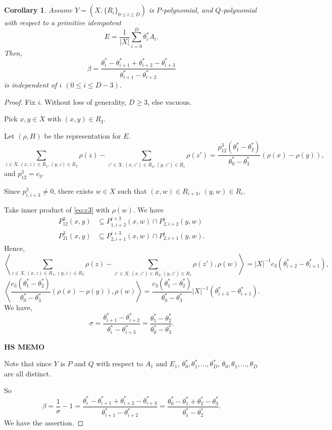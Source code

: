 \documentclass[
]{book}
\newtheorem{corollary}{Corollary}[chapter]
\theoremstyle{definition}
\theoremstyle{definition}
\theoremstyle{definition}
\theoremstyle{definition}
\theoremstyle{remark}
\begin{document}
\begin{corollary}
\protect\hypertarget{cor:beta}{}\label{cor:beta}Assume \(Y = (X, \{R_i\}_{0\leq i\leq D})\) is \(P\)-polynomial, and \(Q\)-polynomial with respect to a primitive idempotent
\[E = \frac{1}{|X|}\sum_{i=0}^D \theta^*_i A_i.\]
Then,
\[\beta = \frac{\theta^*_i - \theta^*_{i+1} + \theta^*_{i+2}-\theta^*_{i+3}}{\theta^*_{i+1}-\theta^*_{i+2}}\]
is independent of \(i\) \((0\leq i\leq D-3)\).
\end{corollary}

\begin{proof}
Fix \(i\). Without loss of generality, \(D\geq 3\), else vacuous.

Pick \(x,y\in X\) with \((x,y)\in R_3\).

Let \((\rho, H)\) be the representation for \(E\).
\begin{equation}
\sum_{z\in X, (x,z)\in R_1, (y,z)\in R_2}\rho(z) - \sum_{z'\in X, (x,z')\in R_2, (y,z')\in R_1}\rho(z') = \frac{p^3_{12}(\theta^*_1-\theta^*_2)}{\theta^*_0-\theta^*_3}(\rho(x)-\rho(y)), \label{eq:c3}
\end{equation}
and \(p^3_{12} = c_3\).

Since \(p^3_{i,i+3} \neq 0\), there exists \(w\in X\) such that \((x,w)\in R_{i+3}\), \((y,w) \in R_i\).

Take inner product of \eqref{eq:c3} with \(\rho(w)\). We have
\begin{align}
P^3_{12}(x,y) & \subseteq P^{i+3}_{1,i+2}(x,w)\cap P^i_{2,i+2}(y,w)\\
P^3_{21}(x,y) & \subseteq P^{i+3}_{2,i+1}(x,w)\cap P^i_{2,i+1}(y,w).
\end{align}
Hence,
\[\left\langle \sum_{z\in X, (x,z)\in R_1, (y,z)\in R_2}\rho(z) - \sum_{z'\in X, (x,z')\in R_2, (y,z')\in R_1}\rho(z'), \rho(w)\right\rangle = |X|^{-1}c_3(\theta^*_{i+2}-\theta^*_{i+1}),\]
\[\left\langle \frac{c_3(\theta^*_1-\theta^*_2)}{\theta^*_0-\theta^*_3}(\rho(x)-\rho(y)), \rho(w)\right\rangle = \frac{c_3(\theta^*_1-\theta^*_2)}{\theta^*_0-\theta^*_3}|X|^{-1}(\theta^*_{i+3}-\theta^*_{i+1}).\]
We have,
\[\sigma = \frac{\theta^*_{i+1}-\theta^*_{i+2}}{\theta^*_i-\theta^*_{i+3}} = \frac{\theta^*_1-\theta^*_2}{\theta^*_0-\theta^*_3}.\]

\textbf{HS MEMO}

Note that since \(Y\) is \(P\) and \(Q\) with respect to \(A_1\) and \(E_1\), \(\theta^*_0, \theta^*_1, \ldots, \theta^*_D\), \(\theta_0, \theta_1, \ldots, \theta_D\) are all distinct.

So
\[\beta = \frac{1}{\sigma}-1 = \frac{\theta^*_i - \theta^*_{i+1} + \theta^*_{i+2}-\theta^*_{i+3}}{\theta^*_{i+1}-\theta^*_{i+2}} = \frac{\theta^*_0 - \theta^*_{1} + \theta^*_{2}-\theta^*_{3}}{\theta^*_{1}-\theta^*_{2}}.\]
We have the assertion.
\end{proof}
\end{document}
